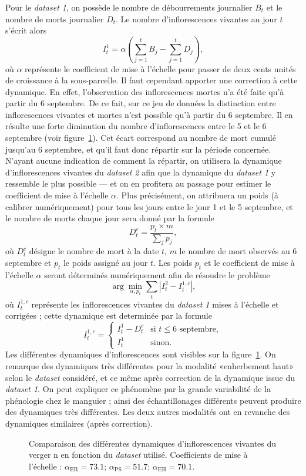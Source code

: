 Pour le \emph{dataset 1}, on possède le nombre de débourrements journalier $B_t$ et le nombre de morts journalier $D_t$.
Le nombre d'inflorescences vivantes au jour $t$ s'écrit alors
\[
I_t^1 = \alpha\left( \sum_{j=1}^{t} B_j - \sum_{j=1}^{t} D_j \right),
\]
où $\alpha$ représente le coefficient de mise à l'échelle pour passer de deux cents unités de croissance à la sous-parcelle.
Il faut cependant apporter une correction à cette dynamique.
En effet, l'observation des inflorescences mortes n'a été faite qu'à partir du 6 septembre.
De ce fait, sur ce jeu de données la distinction entre inflorescences vivantes et mortes n'est possible qu'à partir du 6 septembre.
Il en résulte une forte diminution du nombre d'inflorescences entre le 5 et le 6 septembre (voir figure~\ref{fig:inflos}).
Cet écart correspond au nombre de mort cumulé jusqu'au 6 septembre, et qu'il faut donc répartir sur la période concernée.
N'ayant aucune indication de comment la répartir, on utilisera la dynamique d'inflorescences vivantes du \emph{dataset 2} afin que la dynamique du \emph{dataset 1} y ressemble le plus possible --- et on en profitera au passage pour estimer le coefficient de mise à l'échelle $\alpha$.
Plus précisément, on attribuera un poids (à calibrer numériquement) pour tous les jours entre le jour 1 et le 5 septembre, et le nombre de morts chaque jour sera donné par la formule
\[
D_{t}^{c} = \frac{p_t\times m}{\sum_{j}p_j},
\]
où $D_{t}^{c}$ désigne le nombre de mort à la date $t$, $m$ le nombre de mort observés au 6 septembre et $p_t$ le poids assigné au jour $t$. 
Les poids $p_t$ et le coefficient de mise à l'échelle $\alpha$ seront déterminés numériquement afin de résoudre le problème
\[
\arg\min_{\alpha, p_t} \sum_{t}\left|I^{2}_{t} - I_{t}^{1, c}\right|, 
\]
où $I_{t}^{1, c}$ représente les inflorescences vivantes du \emph{dataset 1} mises à l'échelle et corrigées ; cette dynamique est determinée par la formule
\[
I_{t}^{1, c} = \begin{cases}
                I_t^1 - D_t^{c} & \text{si } t \leq 6 \text{ septembre},\\
                I_t^1 & \text{sinon}.
               \end{cases}
\]
Les différentes dynamiques d'inflorescences sont visibles sur la figure~\ref{fig:inflos}.
On remarque des dynamiques très différentes pour la modalité «enherbement haut» selon le \emph{dataset} considéré, et ce même après correction de la dynamique issue du \emph{dataset 1}.
On peut expliquer ce phénomène par la grande variabilité de la phénologie chez le manguier ; ainsi des échantillonages différents peuvent produire des dynamiques très différentes.
Les deux autres modalités ont en revanche des dynamiques similaires (après correction).
\begin{figure}[ht]
\centering
{}
\caption{Comparaison des différentes dynamiques d'inflorescences vivantes du verger n en fonction du \emph{dataset} utilisé. Coefficients de mise à l'échelle : $\alpha_{\text{ER}} = 73.1$; $\alpha_{\text{PS}} = 51.7$; $\alpha_{\text{EH}} = 70.1.$}
\label{fig:inflos}
\end{figure}

